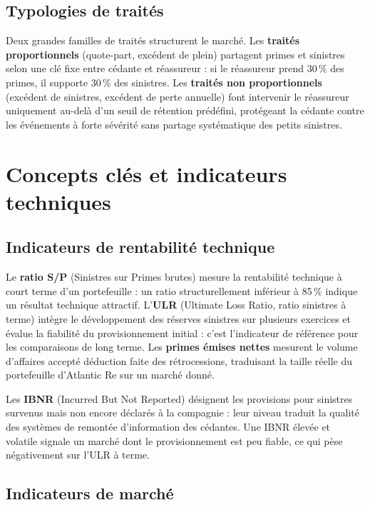 \documentclass[../main.tex]{subfiles}
\begin{document}
\subsection{Typologies de traités}

Deux grandes familles de traités structurent le marché. Les \textbf{traités
proportionnels} (quote-part, excédent de plein) partagent primes et sinistres selon
une clé fixe entre cédante et réassureur : si le réassureur prend 30\,\% des primes,
il supporte 30\,\% des sinistres. Les \textbf{traités non proportionnels} (excédent
de sinistres, excédent de perte annuelle) font intervenir le réassureur uniquement
au-delà d'un seuil de rétention prédéfini, protégeant la cédante contre les
événements à forte sévérité sans partage systématique des petits sinistres.

\section{Concepts clés et indicateurs techniques}

\subsection{Indicateurs de rentabilité technique}

Le \textbf{ratio S/P} (Sinistres sur Primes brutes) mesure la rentabilité technique
à court terme d'un portefeuille : un ratio structurellement inférieur à 85\,\% indique
un résultat technique attractif. L'\textbf{ULR} (Ultimate Loss Ratio, ratio sinistres
à terme) intègre le développement des réserves sinistres sur plusieurs exercices et
évalue la fiabilité du provisionnement initial : c'est l'indicateur de référence pour
les comparaisons de long terme. Les \textbf{primes émises nettes} mesurent le volume
d'affaires accepté déduction faite des rétrocessions, traduisant la taille réelle du
portefeuille d'Atlantic Re sur un marché donné.

Les \textbf{IBNR} (Incurred But Not Reported) désignent les provisions pour sinistres
survenus mais non encore déclarés à la compagnie : leur niveau traduit la qualité
des systèmes de remontée d'information des cédantes. Une IBNR élevée et volatile
signale un marché dont le provisionnement est peu fiable, ce qui pèse négativement
sur l'ULR à terme.

\subsection{Indicateurs de marché}
\end{document}
